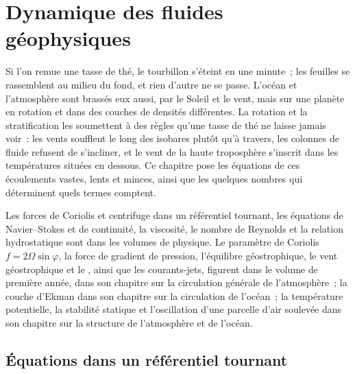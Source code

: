\chapter{Dynamique des fluides géophysiques}\label{ch:b3:gfd-foundations}

Si l'on remue une tasse de thé, le tourbillon s'éteint en une minute~; les feuilles se rassemblent au
milieu du fond, et rien d'autre ne se passe. L'océan et l'atmosphère
sont brassés eux aussi, par le Soleil et le vent, mais sur une planète en rotation et dans
des couches de densités différentes. La rotation et la stratification les soumettent
à des règles qu'une tasse de thé ne laisse jamais voir~: les vents soufflent le long des
isobares plutôt qu'à travers, les colonnes de fluide refusent de s'incliner, et le vent de la
haute troposphère s'inscrit dans les températures situées en dessous. Ce chapitre pose les
équations de ces écoulements vastes, lents et minces, ainsi que les quelques nombres qui
déterminent quels termes comptent.

\begin{recall}
Les forces de Coriolis et centrifuge dans un référentiel tournant, les équations de Navier--Stokes
et de continuité, la viscosité, le nombre de Reynolds et la relation hydrostatique
sont dans les volumes de physique. Le paramètre de Coriolis $f = 2\Omega
\sin\varphi$, la force de gradient de pression, l'équilibre géostrophique, le
vent géostrophique et le , ainsi que les courants-jets, figurent dans le volume de première
année, dans son chapitre sur la circulation générale de l'atmosphère~; la couche
d'Ekman dans son chapitre sur la circulation de l'océan~; la température
potentielle, la stabilité statique et l'oscillation d'une parcelle d'air soulevée dans
son chapitre sur la structure de l'atmosphère et de l'océan.
\end{recall}

\section{Équations dans un référentiel tournant}\label{sec:b3:gfd-foundations:equations}


